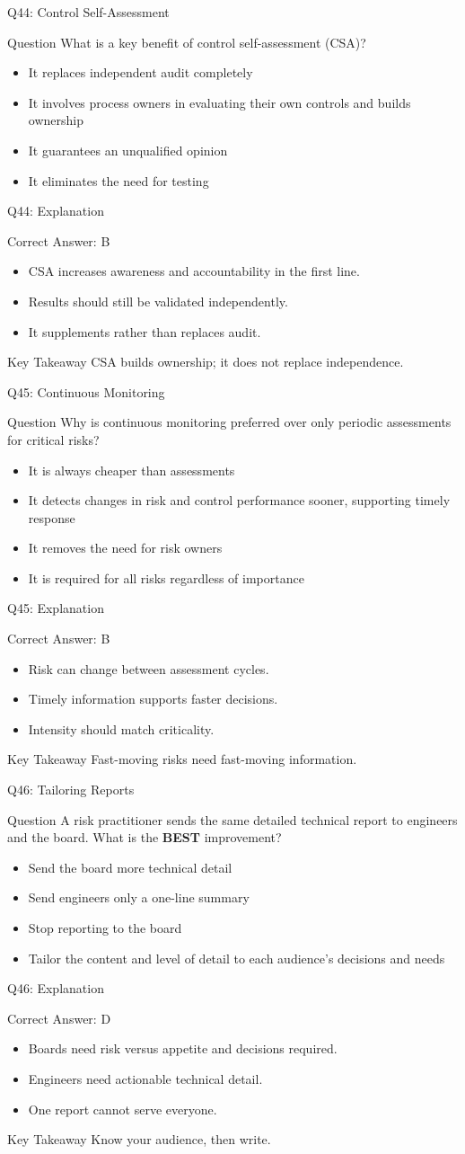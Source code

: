 \documentclass[aspectratio=169]{beamer}
\newcommand{\hq}[7]{%
	\begin{frame}{Q#1: #2}
		\begin{block}{Question}
			#3
		\end{block}
		\begin{itemize}
			#4
		\end{itemize}
	\end{frame}
	\begin{frame}{Q#1: Explanation}
		\begin{block}{Correct Answer: #5}
			\begin{itemize}
				#6
			\end{itemize}
		\end{block}
		\begin{alertblock}{Key Takeaway}
			#7
		\end{alertblock}
	\end{frame}
}
\begin{document}
	\hq{44}{Control Self-Assessment}
	{What is a key benefit of control self-assessment (CSA)?}
	{\item[\textbf{(A)}] It replaces independent audit completely
		\item[\textbf{(B)}] It involves process owners in evaluating their own controls and builds ownership
		\item[\textbf{(C)}] It guarantees an unqualified opinion
		\item[\textbf{(D)}] It eliminates the need for testing}
	{B}
	{\item CSA increases awareness and accountability in the first line.
		\item Results should still be validated independently.
		\item It supplements rather than replaces audit.}
	{CSA builds ownership; it does not replace independence.}
	
	\hq{45}{Continuous Monitoring}
	{Why is continuous monitoring preferred over only periodic assessments for critical risks?}
	{\item[\textbf{(A)}] It is always cheaper than assessments
		\item[\textbf{(B)}] It detects changes in risk and control performance sooner, supporting timely response
		\item[\textbf{(C)}] It removes the need for risk owners
		\item[\textbf{(D)}] It is required for all risks regardless of importance}
	{B}
	{\item Risk can change between assessment cycles.
		\item Timely information supports faster decisions.
		\item Intensity should match criticality.}
	{Fast-moving risks need fast-moving information.}
	
	\hq{46}{Tailoring Reports}
	{A risk practitioner sends the same detailed technical report to engineers and the board. What is the \textbf{BEST} improvement?}
	{\item[\textbf{(A)}] Send the board more technical detail
		\item[\textbf{(B)}] Send engineers only a one-line summary
		\item[\textbf{(C)}] Stop reporting to the board
		\item[\textbf{(D)}] Tailor the content and level of detail to each audience's decisions and needs}
	{D}
	{\item Boards need risk versus appetite and decisions required.
		\item Engineers need actionable technical detail.
		\item One report cannot serve everyone.}
	{Know your audience, then write.}
	
\end{document}
